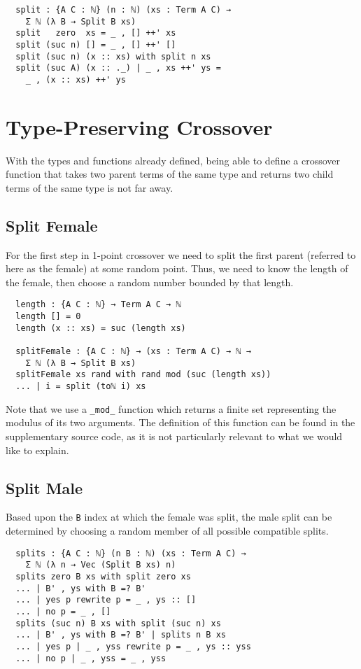 \documentclass{acm_proc_article-sp}
\begin{document}
\begin{verbatim}
  split : {A C : ℕ} (n : ℕ) (xs : Term A C) →
    Σ ℕ (λ B → Split B xs)
  split   zero  xs = _ , [] ++' xs
  split (suc n) [] = _ , [] ++' []
  split (suc n) (x :: xs) with split n xs
  split (suc A) (x :: ._) | _ , xs ++' ys =
    _ , (x :: xs) ++' ys
\end{verbatim}

\section{Type-Preserving Crossover}

With the types and functions already defined, being able to define a
crossover function that takes two parent terms of the same type and
returns two child terms of the same type is not far away.

\subsection{Split Female}

For the first step in 1-point crossover we need to split the first
parent (referred to here as the female) at some random point. Thus, we
need to know the length of the female, then choose a random number
bounded by that length.

\begin{verbatim}
  length : {A C : ℕ} → Term A C → ℕ
  length [] = 0
  length (x :: xs) = suc (length xs)

  splitFemale : {A C : ℕ} → (xs : Term A C) → ℕ →
    Σ ℕ (λ B → Split B xs)
  splitFemale xs rand with rand mod (suc (length xs))
  ... | i = split (toℕ i) xs
\end{verbatim}

Note that we use a \texttt{\_mod\_} function which returns a finite set
representing the modulus of its two arguments. The definition of this
function can be found in the supplementary source code, as it is not
particularly relevant to what we would like to explain.

\subsection{Split Male}

Based upon the \texttt{B} index at which the female was split, the
male split can be determined by choosing a random member of all
possible compatible splits.

\begin{verbatim}
  splits : {A C : ℕ} (n B : ℕ) (xs : Term A C) →
    Σ ℕ (λ n → Vec (Split B xs) n)
  splits zero B xs with split zero xs
  ... | B' , ys with B =? B'
  ... | yes p rewrite p = _ , ys :: []
  ... | no p = _ , []
  splits (suc n) B xs with split (suc n) xs
  ... | B' , ys with B =? B' | splits n B xs
  ... | yes p | _ , yss rewrite p = _ , ys :: yss
  ... | no p | _ , yss = _ , yss
\end{verbatim}
\end{document}
